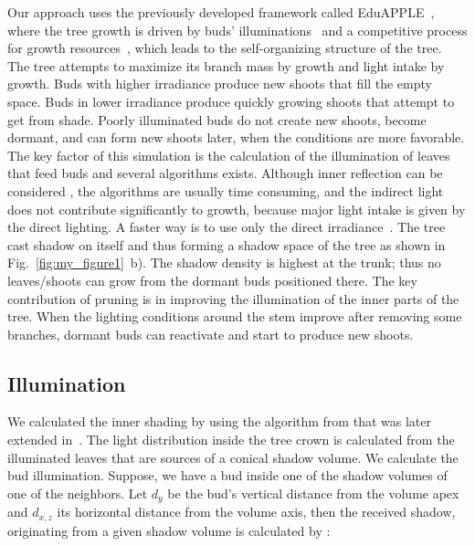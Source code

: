 Our approach uses the previously developed framework called EduAPPLE~\cite{kohek_eduapple:_2015},
where the tree growth is driven by buds' illuminations~\cite{benes_efficient_1996,benes_visual_1997,mech_visual_1996} and a competitive process for growth resources~\cite{alsweis_modeling_2005,arvo_modeling_1988,palubicki_self-organizing_2009,runions_modeling_2007}, which leads to the self-organizing structure of the tree. The
tree attempts to maximize its branch mass by growth and light intake by
growth. Buds with higher irradiance produce new shoots that fill the
empty space. Buds in lower irradiance produce quickly growing shoots
that attempt to get from shade. Poorly illuminated buds do not create
new shoots, become dormant, and can form new shoots later, when the
conditions are more favorable. The key factor of this simulation is the
calculation of the illumination of leaves that feed buds and several
algorithms exists. Although inner reflection can be considered \cite{soler_efficient_2003},
the algorithms are usually time consuming, and the indirect light does
not contribute significantly to growth, because major light intake is
given by the direct lighting. A faster way is to use only the direct
irradiance~\cite{benes_visual_1997,benes_efficient_1996,mech_visual_1996,pirk_plastic_2012}. 
The tree cast shadow on itself and thus
forming a shadow space of the tree as shown in Fig.~\ref{fig:my_figure1}~b). The shadow
density is highest at the trunk; thus no leaves/shoots can grow from the
dormant buds positioned there. The key contribution of pruning is in
improving the illumination of the inner parts of the tree. When the
lighting conditions around the stem improve after removing some
branches, dormant buds can reactivate and start to produce new shoots.


\subsection{Illumination}
We calculated the inner shading by using the algorithm from \cite{palubicki_self-organizing_2009}
that was later extended in~\cite{pirk_plastic_2012,stava_inverse_2014,strnad_novel_2017}. The light distribution
inside the tree crown is calculated from the illuminated leaves that are
sources of a conical shadow volume. We calculate the bud illumination.
Suppose, we have a bud inside one of the shadow volumes of one of the
neighbors. Let \(d_{y}\) be the bud's vertical distance from the volume
apex and \(d_{x,z}\) its horizontal distance from the volume axis, then
the received shadow, originating from a given shadow volume is
calculated by \cite{strnad_novel_2017}:


